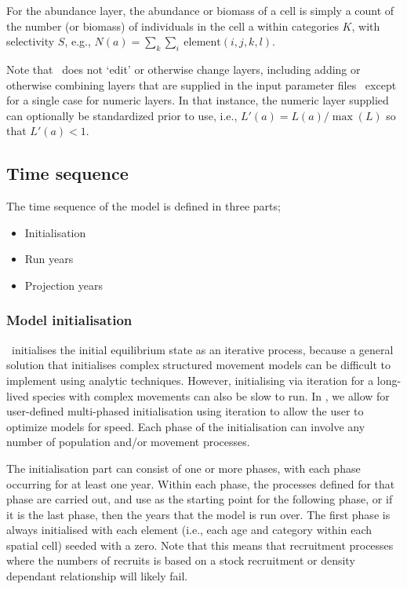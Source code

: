 For the abundance layer, the abundance or biomass of a cell is simply a count of the number (or biomass) of individuals in the cell a within categories $K$, with selectivity $S$, e.g., $N(a)=\sum_k \sum_i \ \text{element}(i,j,k,l)$.

Note that \SPM\ does not `edit' or otherwise change layers, including adding or otherwise combining layers that are supplied in the input parameter files \textemdash\ except for a single case for numeric layers. In that instance, the numeric layer supplied can optionally be standardized prior to use, i.e., $L'(a)=L(a)/\max(L)$ so that $L'(a) < 1$.

\subsection{Time sequence}

The time sequence of the model is defined in three parts;
\begin{itemize}
  \item Initialisation 
  \item Run years
  \item Projection years
\end{itemize}

\subsubsection{Model initialisation}

\SPM\ initialises the initial equilibrium state as an iterative process, because a general solution that initialises complex structured movement models can be difficult to implement using analytic techniques. However, initialising via iteration for a long-lived species with complex movements can also be slow to run. In \SPM, we allow for user-defined multi-phased initialisation using iteration to allow the user to optimize models for speed. Each phase of the initialisation can involve any number of population and/or movement processes. 

The initialisation part can consist of one or more phases, with each phase occurring for at least one year. Within each phase, the processes defined for that phase are carried out, and use as the starting point for the following phase, or if it is the last phase, then the years that the model is run over. The first phase is always initialised with each element (i.e., each age and category within each spatial cell) seeded with a zero. Note that this means that recruitment processes where the numbers of recruits is based on a stock recruitment or density dependant relationship will likely fail. 


